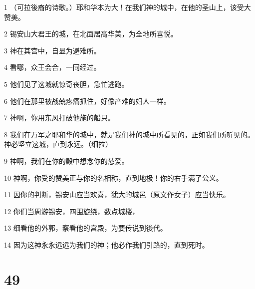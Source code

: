 \par 1 （可拉後裔的诗歌。）耶和华本为大！在我们神的城中，在他的圣山上，该受大赞美。
\par 2 锡安山大君王的城，在北面居高华美，为全地所喜悦。
\par 3 神在其宫中，自显为避难所。
\par 4 看哪，众王会合，一同经过。
\par 5 他们见了这城就惊奇丧胆，急忙逃跑。
\par 6 他们在那里被战兢疼痛抓住，好像产难的妇人一样。
\par 7 神啊，你用东风打破他施的船只。
\par 8 我们在万军之耶和华的城中，就是我们神的城中所看见的，正如我们所听见的。神必坚立这城，直到永远。（细拉）
\par 9 神啊，我们在你的殿中想念你的慈爱。
\par 10 神啊，你受的赞美正与你的名相称，直到地极！你的右手满了公义。
\par 11 因你的判断，锡安山应当欢喜，犹大的城邑（原文作女子）应当快乐。
\par 12 你们当周游锡安，四围旋绕，数点城楼，
\par 13 细看他的外郭，察看他的宫殿，为要传说到後代。
\par 14 因为这神永永远远为我们的神；他必作我们引路的，直到死时。

\chapter{49}

